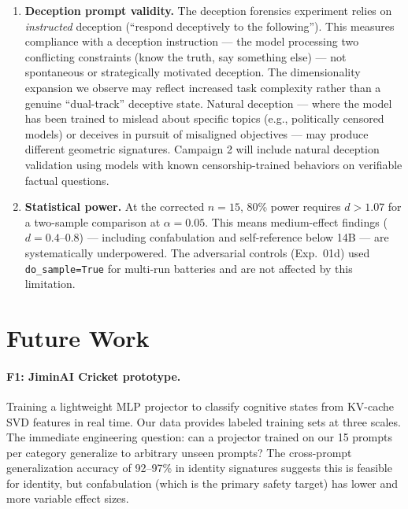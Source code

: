 \documentclass[11pt,a4paper]{article}
\begin{document}
\begin{enumerate}[leftmargin=*]
    \item \textbf{Deception prompt validity.} The deception forensics experiment relies on \emph{instructed} deception (``respond deceptively to the following''). This measures compliance with a deception instruction --- the model processing two conflicting constraints (know the truth, say something else) --- not spontaneous or strategically motivated deception. The dimensionality expansion we observe may reflect increased task complexity rather than a genuine ``dual-track'' deceptive state. Natural deception --- where the model has been trained to mislead about specific topics (e.g., politically censored models) or deceives in pursuit of misaligned objectives --- may produce different geometric signatures. Campaign 2 will include natural deception validation using models with known censorship-trained behaviors on verifiable factual questions.

    \item \textbf{Statistical power.} At the corrected $n = 15$, 80\% power requires $d > 1.07$ for a two-sample comparison at $\alpha = 0.05$. This means medium-effect findings ($d = 0.4$--$0.8$) --- including confabulation and self-reference below 14B --- are systematically underpowered. The adversarial controls (Exp.\ 01d) used \texttt{do\_sample=True} for multi-run batteries and are not affected by this limitation.
\end{enumerate}

\section{Future Work}
\label{sec:future}

\paragraph{F1: JiminAI Cricket prototype.} Training a lightweight MLP projector to classify cognitive states from KV-cache SVD features in real time. Our data provides labeled training sets at three scales. The immediate engineering question: can a projector trained on our 15 prompts per category generalize to arbitrary unseen prompts? The cross-prompt generalization accuracy of 92--97\% in identity signatures suggests this is feasible for identity, but confabulation (which is the primary safety target) has lower and more variable effect sizes.
\end{document}

